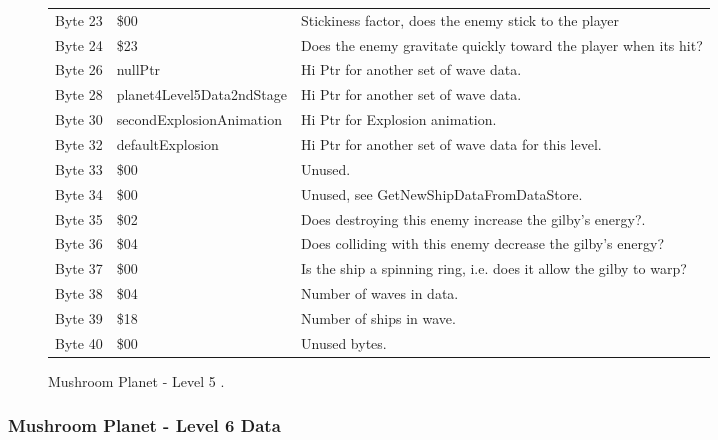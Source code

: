 \begin{figure}[H]
{\begin{adjustbox}{width=12cm}
\begin{tabular}{lll}
 Byte 23 & \$00                       & Stickiness factor, does the enemy stick to the player              \\
 Byte 24 & \$23                       & Does the enemy gravitate quickly toward the player when its hit?   \\
 Byte 26 & nullPtr                   & Hi Ptr for another set of wave data.                               \\
 Byte 28 & planet4Level5Data2ndStage & Hi Ptr for another set of wave data.                               \\
 Byte 30 & secondExplosionAnimation  & Hi Ptr for Explosion animation.                                    \\
 Byte 32 & defaultExplosion          & Hi Ptr for another set of wave data for this level.                \\
 Byte 33 & \$00                       & Unused.                                                            \\
 Byte 34 & \$00                       & Unused, see GetNewShipDataFromDataStore.                           \\
 Byte 35 & \$02                       & Does destroying this enemy increase the gilby's energy?.           \\
 Byte 36 & \$04                       & Does colliding with this enemy decrease the gilby's energy?        \\
 Byte 37 & \$00                       & Is the ship a spinning ring, i.e. does it allow the gilby to warp? \\
 Byte 38 & \$04                       & Number of waves in data.                                           \\
 Byte 39 & \$18                       & Number of ships in wave.                                           \\
 Byte 40 & \$00                       & Unused bytes.                                                      \\
\bottomrule
\end{tabular}

  \end{adjustbox}

  }\caption*{Mushroom Planet - Level 5
.}
\end{figure}

\clearpage
\subsubsection{Mushroom Planet - Level 6 Data}

